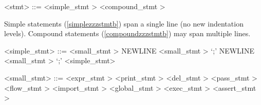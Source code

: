 \newlength{\tw}
\newlength{\len}

\label{stmtb}

\begin{grammar}
<stmt> ::= <simple_stmt \myref[simplezzzstmtb]>
	\alt <compound_stmt \myref[compoundzzzstmtb]>
\end{grammar}

Simple statements (\ref{simplezzzstmtb}) span a single line (no new indentation levels).  Compound statements (\ref{compoundzzzstmtb}) may span multiple lines. \\

\label{simplezzzstmtb}

\begin{grammar}
<simple_stmt> ::= <small_stmt \myref[smallzzzstmtb]> NEWLINE
	\alt <small_stmt \myref[smallzzzstmtb]> `;' NEWLINE
	\alt <small_stmt \myref[smallzzzstmtb]> `;' <simple_stmt>
\end{grammar}


\label{smallzzzstmtb}

\begin{grammar}
<small_stmt> ::= <expr_stmt \myref[exprzzzstmtb]>
	\alt <print_stmt \myref[printzzzstmtb]>
	\alt <del_stmt \myref[delzzzstmtb]>
	\alt <pass_stmt \myref[passzzzstmtb]>
	\alt <flow_stmt \myref[flowzzzstmtb]>
	\alt <import_stmt \myref[importzzzstmtb]>
	\alt <global_stmt \myref[globalzzzstmtb]>
	\alt <exec_stmt \myref[execzzzstmtb]>
	\alt <assert_stmt \myref[assertzzzstmtb]>
\end{grammar}

